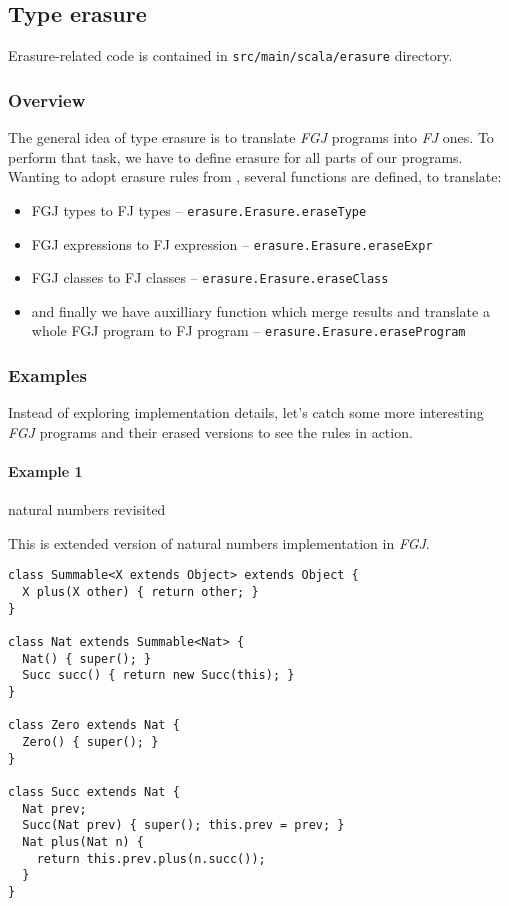 \documentclass{article}[12pt]
\begin{document}
\subsection{Type erasure}

Erasure-related code is contained in \texttt{src/main/scala/erasure}
directory.

\subsubsection{Overview}

The general idea of type erasure is to translate \emph{FGJ}
programs into \emph{FJ} ones. To perform that task, we have to
define erasure for all parts of our programs. Wanting to adopt
erasure rules from \cite{fj}, several functions are defined, to
translate:

\begin{itemize}
\item FGJ types to FJ types -- \texttt{erasure.Erasure.eraseType}
\item FGJ expressions to FJ expression --
  \texttt{erasure.Erasure.eraseExpr}
\item FGJ classes to FJ classes -- \texttt{erasure.Erasure.eraseClass}
\item and finally we have auxilliary function which merge results
  and translate a whole FGJ program to FJ program --
  \texttt{erasure.Erasure.eraseProgram}
\end{itemize}

\subsubsection{Examples}

Instead of exploring implementation details, let's catch some more
interesting \emph{FGJ} programs and their erased versions to see
the rules in action.

\paragraph{Example 1} natural numbers revisited

This is extended version of natural numbers implementation in
\emph{FGJ}.

\begin{verbatim}
class Summable<X extends Object> extends Object {
  X plus(X other) { return other; }
}

class Nat extends Summable<Nat> {
  Nat() { super(); }
  Succ succ() { return new Succ(this); }
}

class Zero extends Nat { 
  Zero() { super(); }
}

class Succ extends Nat {
  Nat prev;
  Succ(Nat prev) { super(); this.prev = prev; }
  Nat plus(Nat n) {
    return this.prev.plus(n.succ());
  }
}
\end{verbatim}
\end{document}
